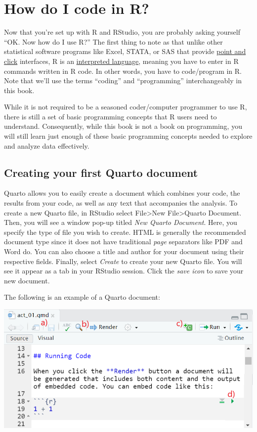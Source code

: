 \documentclass[
  letterpaper,
  DIV=11,
  numbers=noendperiod]{scrreprt}
\theoremstyle{definition}
\theoremstyle{remark}
\begin{document}
\hypertarget{sec-code}{%
\section{How do I code in R?}\label{sec-code}}

Now that you're set up with R and RStudio, you are probably asking
yourself ``OK. Now how do I use R?'' The first thing to note as that
unlike other statistical software programs like Excel, STATA, or SAS
that provide \href{https://en.wikipedia.org/wiki/Point_and_click}{point
and click} interfaces, R is an
\href{https://en.wikipedia.org/wiki/Interpreted_language}{interpreted
language}, meaning you have to enter in R commands written in R code. In
other words, you have to code/program in R. Note that we'll use the
terms ``coding'' and ``programming'' interchangeably in this book.

While it is not required to be a seasoned coder/computer programmer to
use R, there is still a set of basic programming concepts that R users
need to understand. Consequently, while this book is not a book on
programming, you will still learn just enough of these basic programming
concepts needed to explore and analyze data effectively.

\hypertarget{creating-your-first-quarto-document}{%
\subsection{Creating your first Quarto
document}\label{creating-your-first-quarto-document}}

Quarto allows you to easily create a document which combines your code,
the results from your code, as well as any text that accompanies the
analysis. To create a new Quarto file, in RStudio select
File\textgreater New File\textgreater Quarto Document. Then, you will
see a window pop-up titled \emph{New Quarto Document}. Here, you specify
the type of file you wish to create. HTML is generally the recommended
document type since it does not have traditional \emph{page} separators
like PDF and Word do. You can also choose a title and author for your
document using their respective fields. Finally, select \emph{Create} to
create your new Quarto file. You will see it appear as a tab in your
RStudio session. Click the \emph{save icon} to save your new document.

The following is an example of a Quarto document:

\includegraphics{images/quarto_example.png}
\end{document}
